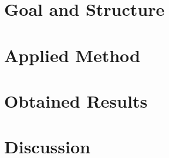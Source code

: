 \documentclass[sigconf, nonacm]{acmart}
\begin{document}
\section{Goal and Structure}
\label{goal_and_structure}







\section{Applied Method}
\label{applied_methods}



\section{Obtained Results}
\label{obtained_results}



\section{Discussion}
\label{discussion}




\end{document}
